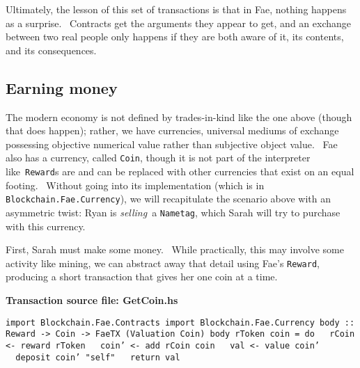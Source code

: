 \documentclass[11pt]{article}
\newcommand{\codeblock}[1]{\begin{mdframed}[
    backgroundcolor=header-color,
    linecolor=header-color,
    innertopmargin=10pt,
    ]{\texttt{#1}}\end{mdframed}}
\begin{document}
\vspace{11pt}

Ultimately, the lesson of this set of transactions is that in Fae, nothing happens as a surprise.  Contracts get the arguments they appear to get, and an exchange between two real people only happens if they are both aware of it, its contents, and its consequences.

\subsection{Earning money}
\vspace{5.5pt}

The modern economy is not defined by trades-in-kind like the one above (though that does happen); rather, we have currencies, universal mediums of exchange possessing objective numerical value rather than subjective object value.  Fae also has a currency, called \texttt{Coin}, though it is not part of the interpreter like \texttt{Reward}s are and can be replaced with other currencies that exist on an equal footing.  Without going into its implementation (which is in \texttt{Blockchain.Fae.Currency}), we will recapitulate the scenario above with an asymmetric twist: Ryan is \textit{selling} a \texttt{Nametag}, which Sarah will try to purchase with this currency.


\vspace{11pt}

First, Sarah must make some money.  While practically, this may involve some activity like mining, we can abstract away that detail using Fae's \texttt{Reward}, producing a short transaction that gives her one coin at a time.


\vspace{11pt}

\textbf{Transaction source file: GetCoin.hs}

\codeblock{import Blockchain.Fae.Contracts\newline
import Blockchain.Fae.Currency\newline
\newline
body :: Reward -\textgreater{} Coin -\textgreater{} FaeTX (Valuation Coin)\newline
body rToken coin = do\newline
  rCoin \textless{}- reward rToken\newline
  coin' \textless{}- add rCoin coin\newline
  val \textless{}- value coin'\newline
  deposit coin' "self"\newline
  return val}
\end{document}
